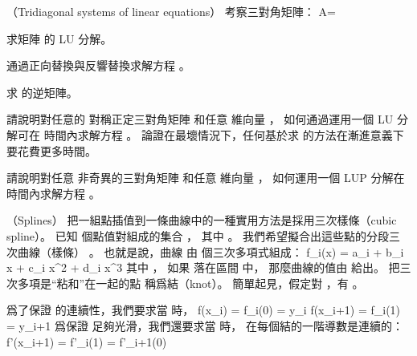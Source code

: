 \startsubject[
  title={Problems},
]

（Tridiagonal systems of linear equations）
考察三對角矩陣：
\startformula
A=\left[\startmatrix
\NC 1 \NC -1\NC 0 \NC 0 \NC 0 \NR
\NC -1 \NC 2\NC -1 \NC 0 \NC 0 \NR
\NC 0 \NC -1\NC 2 \NC -1 \NC 0 \NR
\NC 0 \NC 0 \NC -1 \NC 2 \NC -1 \NR
\NC 0 \NC 0 \NC 0 \NC -1 \NC 2 \NR
\stopmatrix\right]
\stopformula

\startigBase[a]\startitem
求矩陣  的 LU 分解。
\stopitem\stopigBase

\startANSWER
{}
\stopANSWER

\startigBase[continue]\startitem
通過正向替換與反響替換求解方程 。
\stopitem\stopigBase

\startANSWER
{}
\stopANSWER

\startigBase[continue]\startitem
求  的逆矩陣。
\stopitem\stopigBase

\startANSWER
{}
\stopANSWER

\startigBase[continue]\startitem
請說明對任意的  對稱正定三對角矩陣  和任意  維向量 ，
如何通過運用一個 LU 分解可在  時間內求解方程 。
論證在最壞情況下，任何基於求  的方法在漸進意義下要花費更多時間。
\stopitem\stopigBase

\startANSWER
{}
\stopANSWER

\startigBase[continue]\startitem
請說明對任意  非奇異的三對角矩陣  和任意  維向量 ，
如何運用一個 LUP 分解在  時間內求解方程 。
\stopitem\stopigBase

\startANSWER
{}
\stopANSWER
\stopPROBLEM

\startPROBLEM
（Splines）
把一組點插值到一條曲線中的一種實用方法是採用{\EMP 三次樣條}（cubic spline）。
已知  個點值對組成的集合 ，
其中 。
我們希望擬合出這些點的分段三次曲線（樣條） 。
也就是說，曲線  由  個三次多項式組成：
\startformula
f_i(x) = a_i + b_i x + c_i x^2 + d_i x^3
\stopformula
其中 ，
如果  落在區間  中，
那麼曲線的值由  給出。
把三次多項是“粘和”在一起的點  稱爲{\EMP 結}（knot）。
簡單起見，假定對 ，有 。

爲了保證  的連續性，我們要求當  時，
\startformula\startmathalignment
\NC f(x_i) \NC = f_i(0) = y_i \NR
\NC f(x_{i+1}) \NC = f_i(1) = y_{i+1} \NR
\stopmathalignment\stopformula
爲保證  足夠光滑，我們還要求當  時，
在每個結的一階導數是連續的：
\startformula
f'(x_{i+1}) = f'_i(1) = f'_{i+1}(0)
\stopformula

